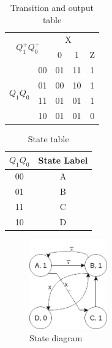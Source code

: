 \documentclass[pdftex,12pt,a4paper]{article}
\begin{document}
\begin{flushleft}
\begin{table}[h]
\centering
\begin{tabular}{cc|cc|c}
\multicolumn{2}{c|}{\multirow{2}{*}{$Q^{+}_{1}Q^{+}_{0}$}} & \multicolumn{2}{c|}{X} &   \\
\multicolumn{2}{c|}{}                                      & 0          & 1         & Z \\ \hline
\multirow{4}{*}{$Q_{1}Q_{0}$}             & 00             & 01         & 11        & 1 \\
                                          & 01             & 00         & 10        & 1 \\
                                          & 11             & 01         & 01        & 1 \\
                                          & 10             & 01         & 01        & 0
\end{tabular}
\caption{Transition and output table}
\label{tab:part1}
\end{table}


\begin{table}[h]
\centering
\begin{tabular}{c|c}
$Q_{1}Q_{0}$ & State Label \\ \hline
00           & A           \\
01           & B           \\
11           & C           \\
10           & D          
\end{tabular}
\caption{State table}
\label{tab:part2}
\end{table}


\begin{figure}[h]
	\centering
	\includegraphics[width=0.3\textwidth]{diagram.png}	
	\caption{State diagram}
	\label{circ:part1b}
\end{figure}



\end{flushleft}
\end{document}
